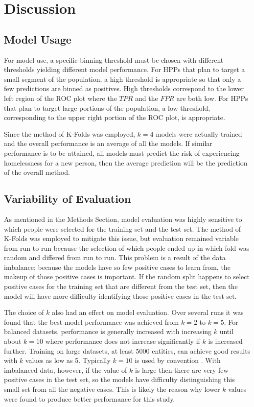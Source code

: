 \documentclass[12pt]{report}
\begin{document}
\chapter{Discussion}
\section{Model Usage}
For model use, a specific binning threshold must be chosen with different thresholds yielding different model performance. For HPPs that plan to target a small segment of the population, a high threshold is appropriate so that only a few predictions are binned as positives. High thresholds correspond to the lower left region of the ROC plot where the $TPR$ and the $FPR$ are both low. For HPPs that plan to target large portions of the population, a low threshold, corresponding to the upper right portion of the ROC plot, is appropriate. 

Since the method of K-Folds was employed, $k=4$ models were actually trained and the overall performance is an average of all the models. If similar performance is to be attained, all models must predict the risk of experiencing homelessness for a new person, then the average prediction will be the prediction of the overall method.

\section{Variability of Evaluation}
As mentioned in the Methods Section, model evaluation was highly sensitive to which people were selected for the training set and the test set. The method of K-Folds was employed to mitigate this issue, but evaluation remained variable from run to run because the selection of which people ended up in which fold was random and differed from run to run. This problem is a result of the data imbalance; because the models have so few positive cases to learn from, the makeup of those positive cases is important. If the random split happens to select positive cases for the training set that are different from the test set, then the model will have more difficulty identifying those positive cases in the test set. 

The choice of $k$ also had an effect on model evaluation. Over several runs it was found that the best model performance was achieved from $k=2$ to $k=5$. For balanced datasets, performance is generally increased with increasing $k$ until about $k=10$ where performance does not increase significantly if $k$ is increased further. Training on large datasets, at least 5000 entities, can achieve good results with $k$ values as low as 5. Typically $k=10$ is used by convention \cite{marcot2020optimal}. With imbalanced data, however, if the value of $k$ is large then there are very few positive cases in the test set, so the models have difficulty distinguishing this small set from all the negative cases. This is likely the reason why lower $k$ values were found to produce better performance for this study.
\end{document}
